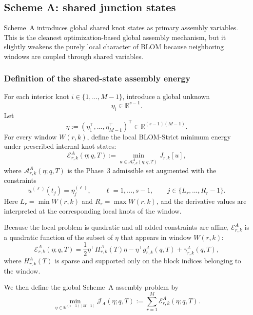 \subsection{Scheme A: shared junction states}
\label{subsec:phase5_schemeA}

Scheme~A introduces global shared knot states as primary assembly variables.
This is the cleanest optimization-based global assembly mechanism, but it slightly weakens the purely local character of BLOM because neighboring windows are coupled through shared variables.

\subsubsection{Definition of the shared-state assembly energy}
\label{subsubsec:phase5_schemeA_definition}

For each interior knot \(i\in\{1,\dots,M-1\}\), introduce a global unknown
\[
\eta_i\in\mathbb R^{s-1}.
\]
Let
\[
\eta:=(\eta_1^\top,\dots,\eta_{M-1}^\top)^\top\in\mathbb R^{(s-1)(M-1)}.
\]
For every window \(W(r,k)\), define the local BLOM-Strict minimum energy under prescribed internal knot states:
\begin{equation}
\label{eq:phase5_local_energy_A}
\mathcal E_{r,k}^{A}(\eta;q,T)
:=
\min_{u\in\mathcal A_{r,k}^{A}(\eta;q,T)} J_{r,k}[u],
\end{equation}
where \(\mathcal A_{r,k}^{A}(\eta;q,T)\) is the Phase~3 admissible set augmented with the constraints
\begin{equation}
\label{eq:phase5_shared_state_constraints}
u^{(\ell)}(t_j)=\eta_j^{(\ell)},
\qquad
\ell=1,\dots,s-1,
\qquad
j\in \{L_r,\dots,R_r-1\}.
\end{equation}
Here \(L_r=\min W(r,k)\) and \(R_r=\max W(r,k)\), and the derivative values are interpreted at the corresponding local knots of the window.

Because the local problem is quadratic and all added constraints are affine, \(\mathcal E_{r,k}^{A}\) is a quadratic function of the subset of \(\eta\) that appears in window \(W(r,k)\):
\begin{equation}
\label{eq:phase5_local_energy_A_quad}
\mathcal E_{r,k}^{A}(\eta;q,T)
=
\frac{1}{2}\eta^\top H_{r,k}^{A}(T)\eta
-
\eta^\top g_{r,k}^{A}(q,T)
+
\gamma_{r,k}^{A}(q,T),
\end{equation}
where \(H_{r,k}^{A}(T)\) is sparse and supported only on the block indices belonging to the window.

We then define the global Scheme~A assembly problem by
\begin{equation}
\label{eq:phase5_schemeA_global_problem}
\boxed{
\min_{\eta\in\mathbb R^{(s-1)(M-1)}}
\mathcal J_A(\eta;q,T)
:=
\sum_{r=1}^{M}\mathcal E_{r,k}^{A}(\eta;q,T).
}
\end{equation}

